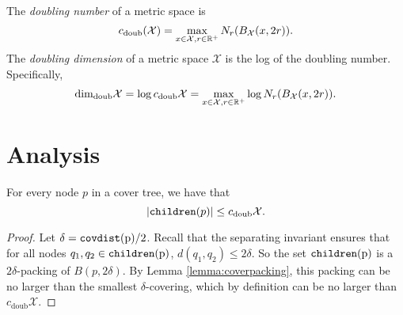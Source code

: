 \documentclass[../main.tex]{subfiles}
\newcommand{\set}[1]{\mathcal {#1}}
\newcommand{\radius}{r}
\newcommand{\dist}[2]{\distf({#1},{#2})}
\newcommand{\distf}{d}
\newcommand{\minkdim}{\text{dim}_\text{Mink}}
\newcommand{\doubdim}{\text{dim}_\text{doub}}
\newcommand{\doubnum}{c_\text{doub}}
\newcommand{\p}{\ensuremath p}
\newcommand{\children}[1]{\ensuremath{\textup{\text{\ttfamily children}({#1})}}}
\newcommand{\covdist}[1]{\ensuremath{\textup{\text{\ttfamily covdist}({#1})}}}
\begin{document}
%

%

\begin{definition}
    The \emph{doubling number} of a metric space is
    \begin{equation}
        \doubnum(\set X) = \max_{x\in\set X, \radius\in\R^+} N_\radius(B_{\set X}(x,2\radius))
        .
    \end{equation}
    The \emph{doubling dimension} of a metric space $\set X$ is the log of the doubling number.
    Specifically,
    \begin{equation}
        \doubdim \set X = \log \doubnum\set X = \max_{x\in\set X, \radius\in\R^+} \log N_\radius(B_{\set X}(x,2\radius))
        .
    \end{equation}
\end{definition}
\cite{gupta2003bounded}


\section{Analysis}

\begin{lemma}
    For every node $p$ in a cover tree, we have that
    \begin{equation}
        |\children\p| \le \doubnum \set X
        .
    \end{equation}
\end{lemma}

\begin{proof}
    Let $\delta=\covdist p/2$.
    Recall that the separating invariant ensures that for all nodes $q_1,q_2\in\children p$,
    $\dist{q_1}{q_2}\le2\delta$.
    So the set \children p is a $2\delta$-packing of $B(p,2\delta)$.
    By Lemma \ref{lemma:coverpacking}, this packing can be no larger than the smallest $\delta$-covering,
    which by definition can be no larger than $\doubnum \set X$.
\end{proof}
\end{document}
